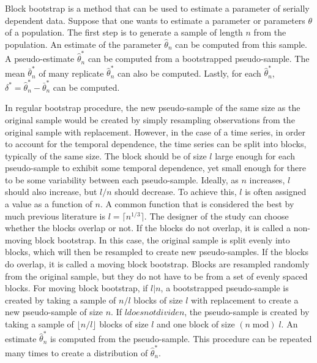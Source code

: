 \documentclass[12pt, letterpaper, titlepage]{article}
\begin{document}
Block bootstrap is a method that can be used to estimate a parameter of serially dependent data. Suppose that one wants to estimate a parameter or parameters $\theta$ of a population. The first step is to generate a sample of length $n$ from the population. An estimate of the parameter $\hat{\theta}_{n}$ can be computed from this sample. A pseudo-estimate $\hat\theta_n^*$ can be computed from a bootstrapped pseudo-sample. The mean $\bar\theta_n^*$ of many replicate $\hat\theta_n^*$ can also be computed. Lastly, for each $\hat\theta_n^*$, $\delta^* = \hat\theta_n^* - \bar\theta_n^*$ can be computed.

In regular bootstrap procedure, the new pseudo-sample of the same size as the original sample would be created by simply resampling observations from the original sample with replacement. However, in the case of a time series, in order to account for the temporal dependence, the time series can be split into blocks, typically of the same size. The block should be of size $l$ large enough for each pseudo-sample to exhibit some temporal dependence, yet small enough for there to be some variability between each pseudo-sample. Ideally, as $n$ increases, $l$ should also increase, but $l / n$ should decrease. To achieve this, $l$ is often assigned a value as a function of $n$. A common function that is considered the best by much previous literature is $l = \lceil n^{1/3} \rceil$. \citep{buhlmann1999block} The designer of the study can choose whether the blocks overlap or not. If the blocks do not overlap, it is called a non-moving block bootstrap. In this case, the original sample is split evenly into blocks, which will then be resampled to create new pseudo-samples. If the blocks do overlap, it is called a moving block bootstrap. Blocks are resampled randomly from the original sample, but they do not have to be from a set of evenly spaced blocks. For moving block bootstrap, if $l \vert n$, a bootstrapped pseudo-sample is created by taking a sample of $n / l$ blocks of size $l$ with replacement to create a new pseudo-sample of size $n$. If $l does not divide n$, the pseudo-sample is created by taking a sample of $\lfloor n / l \rfloor$ blocks of size $l$ and one block of size $(n \;\mathrm{mod})\; l$. An estimate $\hat\theta_n^*$ is computed from the pseudo-sample. This procedure can be repeated many times to create a distribution of $\hat\theta_n^*$. 
\end{document}
